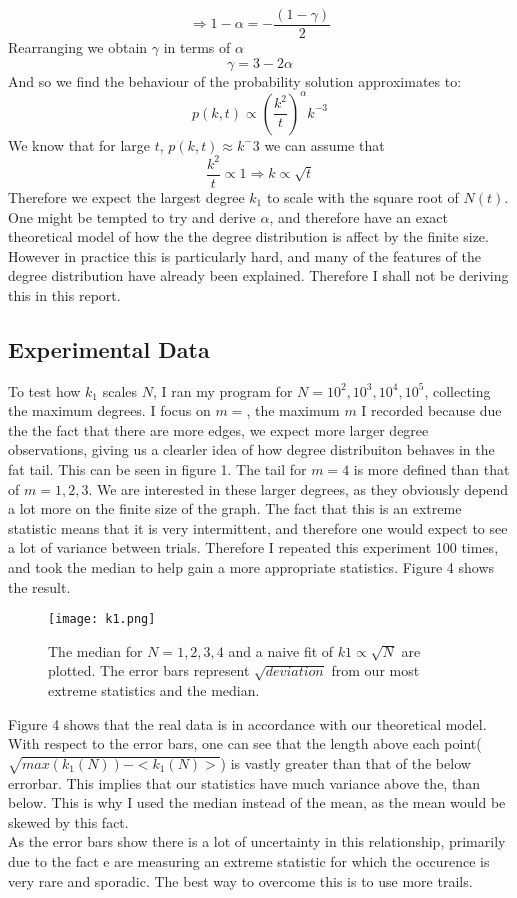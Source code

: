 \documentclass[]{article}
\begin{document}
\begin{equation}
\Rightarrow 1- \alpha= -\frac{(1-\gamma)}{2}
\end{equation}
Rearranging we obtain $\gamma$ in terms of $\alpha$
\begin{equation}
\gamma = 3 - 2\alpha
\end{equation}
And so we find the behaviour of the probability solution approximates to:
\begin{equation}
p(k,t) \propto (\frac{k^2}{t})^{\alpha}k^{-3} 
\end{equation}
We know that for large $t$, $p(k,t) \approx k^-3$ we can assume that
\begin{equation}
 \frac{k^2}{t} \propto 1 \Rightarrow k \propto \sqrt{t}
\end{equation}
Therefore we expect the largest degree $k_1$ to scale with the square root of $N(t)$. One might be tempted to try and derive $\alpha$, and therefore have an exact theoretical model of how the the degree distribution is affect by the finite size. However in practice this is particularly hard, and many of the features of the degree distribution have already been explained. Therefore I shall not be deriving this in this report.
\subsection{Experimental Data}
To test how $k_1$ scales $N$, I ran my program for $N=10^2, 10^3, 10^4, 10^5$, collecting the maximum degrees. I focus on $m=$, the maximum $m$ I recorded because due the the fact that there are more edges, we expect more larger degree observations, giving us a clearler idea of how degree distribuiton behaves in the fat tail. This can be seen in figure 1. The tail for $m=4$ is more defined than that of $m=1,2,3$. We are interested in these larger degrees, as they obviously depend a lot more on the finite size of the graph. The fact that this is an extreme statistic means that it is very intermittent, and therefore one would expect to see a lot of variance between trials. Therefore I repeated this experiment 100 times, and took the median to help gain a more appropriate statistics. Figure 4 shows the result. 
\begin{figure}[H]
	\centering
	
	\texttt{[image: k1.png]}
	\caption{The median for $N=1,2,3,4$ and a naive fit of $k1 \propto \sqrt{N}$ are plotted. The error bars represent $\sqrt{deviation}$ from our most extreme statistics and the  median.}
\end{figure}
Figure 4 shows that the real data is in accordance with our theoretical model. With respect to the error bars, one can see that the length above each point($\sqrt{max(k_1(N))-<k_1(N)>}$) is vastly greater than that of the below errorbar. This implies that our statistics have much variance above the, than below. This is why I used the median instead of the mean, as the mean would be skewed by this fact.\\
As the error bars show there is a lot of uncertainty in this relationship, primarily due to the fact e are measuring an extreme statistic for which the occurence is very rare and sporadic. The best way to overcome this is to use more trails.
\end{document}
